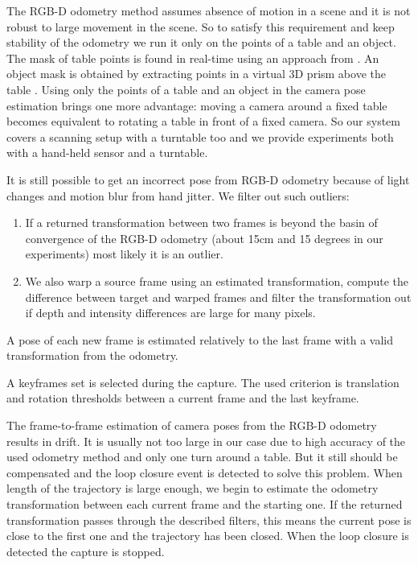 \documentclass[letterpaper, 10 pt, conference]{ieeeconf}  %
\begin{document}
The RGB-D odometry method assumes absence of motion in a scene and it is not
robust to large movement in the scene. So to satisfy this requirement
and keep stability of the odometry we run it only
on the points of a table and an object. The mask of table points
is found in real-time using an approach from \cite{poppinga2008fast}. An object mask is
obtained by extracting points in a virtual 3D prism above the table \cite{rusu2009detecting}.
Using only the points
of a table and an object in the camera pose estimation brings one more advantage:
moving a camera around a fixed table becomes equivalent to rotating
a table in front of a fixed camera. So our system covers a scanning setup with a turntable too
and we provide experiments both with a hand-held sensor and a turntable.

It is still possible to get an incorrect pose from RGB-D odometry
because of light changes and motion blur from hand jitter.
We filter out such outliers:

\begin{enumerate}
 \item If a returned transformation between two frames is beyond the basin of convergence
 of the RGB-D odometry (about 15cm and 15 degrees in our experiments) most likely it is an outlier.
 \item We also warp a source frame using an estimated transformation,
 compute the difference between target and warped frames 
 and filter the transformation out if
 depth and intensity differences are large for many pixels.
\end{enumerate}

A pose of each new frame is estimated relatively to the last frame
with a valid transformation from the odometry.

A keyframes set is selected during the capture.
The used criterion is translation and rotation thresholds 
between a current frame and the last keyframe.

The frame-to-frame estimation of camera poses from the RGB-D 
odometry results in drift. It is usually not too large in our case
due to high accuracy of the used odometry method \cite{steinbrucker2011real}
and only one turn around a table.
But it still should be compensated and the loop closure event is detected to solve this problem.
When length of the trajectory is large enough, we begin to estimate the
odometry transformation between each current frame and the starting one. 
If the returned transformation passes through the described filters, 
this means the current pose is close to the first one and 
the trajectory has been closed. When the loop closure is detected 
the capture is stopped.
\end{document}
